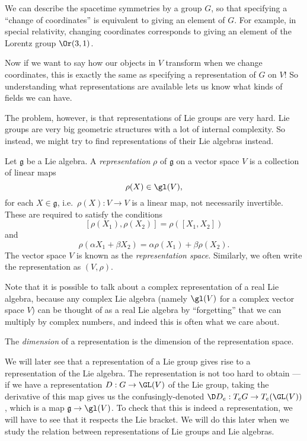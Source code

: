 \documentclass[a4paper]{article}
\begin{document}
We can describe the spacetime symmetries by a group $G$, so that specifying a ``change of coordinates'' is equivalent to giving an element of $G$. For example, in special relativity, changing coordinates corresponds to giving an element of the Lorentz group $\Or(3, 1)$.

Now if we want to say how our objects in $V$ transform when we change coordinates, this is exactly the same as specifying a representation of $G$ on $V$! So understanding what representations are available lets us know what kinds of fields we can have.

The problem, however, is that representations of Lie groups are very hard. Lie groups are very big geometric structures with a lot of internal complexity. So instead, we might try to find representations of their Lie algebras instead.
\begin{defi}
  Let $\mathfrak{g}$ be a Lie algebra. A \emph{representation} $\rho$ of $\mathfrak{g}$ on a vector space $V$ is a collection of linear maps
  \[
    \rho(X) \in \gl(V),
  \]
  for each $X \in \mathfrak{g}$, i.e.\ $\rho(X): V \to V$ is a linear map, not necessarily invertible. These are required to satisfy the conditions
  \[
    [\rho(X_1), \rho(X_2)] = \rho([X_1, X_2])
  \]
  and
  \[
    \rho(\alpha X_1 + \beta X_2) = \alpha \rho(X_1) + \beta \rho(X_2).
  \]
  The vector space $V$ is known as the \emph{representation space}. Similarly, we often write the representation as $(V, \rho)$.
\end{defi}
Note that it is possible to talk about a complex representation of a real Lie algebra, because any complex Lie algebra (namely $\gl(V)$ for a complex vector space $V$) can be thought of as a real Lie algebra by ``forgetting'' that we can multiply by complex numbers, and indeed this is often what we care about.

\begin{defi}
  The \emph{dimension} of a representation is the dimension of the representation space.
\end{defi}

We will later see that a representation of a Lie group gives rise to a representation of the Lie algebra. The representation is not too hard to obtain --- if we have a representation $D: G \to \GL(V)$ of the Lie group, taking the derivative of this map gives us the confusingly-denoted $\D D_e: T_e G \to T_e (\GL(V))$, which is a map $\mathfrak{g} \to \gl(V)$. To check that this is indeed a representation, we will have to see that it respects the Lie bracket. We will do this later when we study the relation between representations of Lie groups and Lie algebras.
\end{document}
